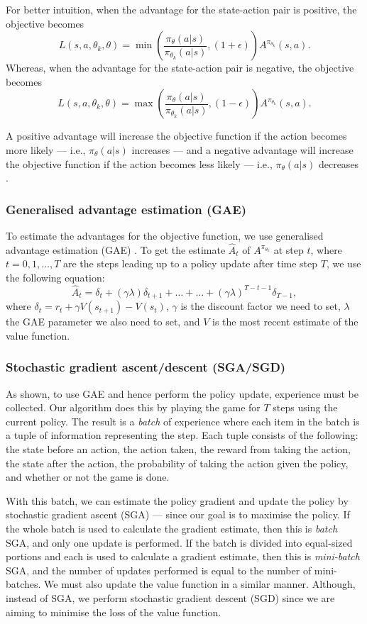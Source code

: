 \documentclass[12pt,a4paper]{article}
\begin{document}
For better intuition, when the advantage for the state-action pair is positive, the objective becomes \[L(s,a,\theta_k,\theta) = \min\left(\frac{\pi_{\theta}(a|s)}{\pi_{\theta_k}(a|s)}, (1 + \epsilon) \right)  A^{\pi_{\theta_k}}(s,a).\] Whereas, when the advantage for the state-action pair is negative, the objective becomes \[L(s,a,\theta_k,\theta) = \max\left(\frac{\pi_{\theta}(a|s)}{\pi_{\theta_k}(a|s)}, (1 - \epsilon) \right)  A^{\pi_{\theta_k}}(s,a).\]

A positive advantage will increase the objective function if the action becomes more likely --- i.e., \(\pi_{\theta}(a|s)\) increases --- and a negative advantage will increase the objective function if the action becomes less likely --- i.e., \(\pi_{\theta}(a|s)\) decreases \cite{SpinningUp2018}. 

\subsubsection{Generalised advantage estimation (GAE)}
To estimate the advantages for the objective function, we use generalised advantage estimation (GAE) \cite{schulman2018highdimensional}. To get the estimate $\hat{A}_t$ of $A^{\pi_{\theta_k}}$ at step $t$, where $t = 0, 1, \dots, T$ are the steps leading up to a policy update after time step $T$, we use the following equation: $$\hat{A}_t = \delta_t + (\gamma\lambda)\delta_{t+1} + \dots + \dots + (\gamma\lambda)^{T-t-1}\delta_{T-1},$$ where $\delta_t = r_t + \gamma V(s_{t+1}) - V(s_t)$, $\gamma$ is the discount factor we need to set, $\lambda$ the GAE parameter we also need to set, and $V$ is the most recent estimate of the value function. 

\subsubsection{Stochastic gradient ascent/descent (SGA/SGD)}
As shown, to use GAE and hence perform the policy update, experience must be collected. Our algorithm does this by playing the game for $T$ steps using the current policy. The result is a \emph{batch} of experience where each item in the batch is a tuple of information representing the step. Each tuple consists of the following: the state before an action, the action taken, the reward from taking the action, the state after the action, the probability of taking the action given the policy, and whether or not the game is done.

With this batch, we can estimate the policy gradient and update the policy by stochastic gradient ascent (SGA) --- since our goal is to maximise the policy. If the whole batch is used to calculate the gradient estimate, then this is \emph{batch} SGA, and only one update is performed. If the batch is divided into equal-sized portions and each is used to calculate a gradient estimate, then this is \emph{mini-batch} SGA, and the number of updates performed is equal to the number of mini-batches. We must also update the value function in a similar manner. Although, instead of SGA, we perform stochastic gradient descent (SGD) since we are aiming to minimise the loss of the value function. 
\end{document}
